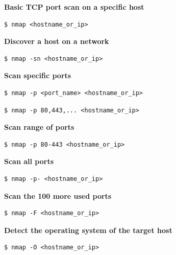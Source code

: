 \documentclass{article}
\newenvironment{codetemplate}[1][]{%
  \mybasecolorbox[#1]
  \itshape
}{%
  \endmybasecolorbox
}
\begin{document}
\textbf{Basic TCP port scan on a specific host}
\begin{codetemplate}{}
\begin{verbatim}
$ nmap <hostname_or_ip>
\end{verbatim}
\end{codetemplate}

\textbf{Discover a host on a network}
\begin{codetemplate}{}
\begin{verbatim}
$ nmap -sn <hostname_or_ip>
\end{verbatim}
\end{codetemplate}

\textbf{Scan specific ports}
\begin{codetemplate}{}
\begin{verbatim}
$ nmap -p <port_name> <hostname_or_ip>
\end{verbatim}
\end{codetemplate}
\begin{codetemplate}{}
\begin{verbatim}
$ nmap -p 80,443,... <hostname_or_ip>
\end{verbatim}
\end{codetemplate}

\textbf{Scan range of ports}
\begin{codetemplate}{}
\begin{verbatim}
$ nmap -p 80-443 <hostname_or_ip>
\end{verbatim}
\end{codetemplate}

\textbf{Scan all ports}
\begin{codetemplate}{}
\begin{verbatim}
$ nmap -p- <hostname_or_ip>
\end{verbatim}
\end{codetemplate}

\textbf{Scan the 100 more used ports}
\begin{codetemplate}{}
\begin{verbatim}
$ nmap -F <hostname_or_ip>
\end{verbatim}
\end{codetemplate}

\textbf{Detect the operating system of the target host}
\begin{codetemplate}{}
\begin{verbatim}
$ nmap -O <hostname_or_ip>
\end{verbatim}
\end{codetemplate}
\end{document}
